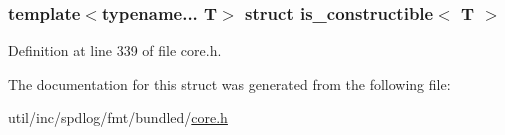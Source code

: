 \subsubsection*{template$<$typename... T$>$\newline
struct is\+\_\+constructible$<$ T $>$}



Definition at line 339 of file core.\+h.



The documentation for this struct was generated from the following file\+:\begin{DoxyCompactItemize}
\item 
util/inc/spdlog/fmt/bundled/\hyperlink{core_8h}{core.\+h}\end{DoxyCompactItemize}
